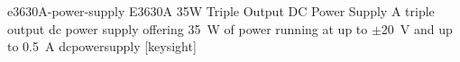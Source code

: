 \newglsXequipment%
{e3630A-power-supply}%
{E3630A 35W Triple Output DC Power Supply}%
{A triple output \gls{dc} power supply offering \SI{35}{\watt} of power running at up to $\pm$\SI{20}{\volt} and up to \SI{0.5}{\ampere}}%
{dcpowersupply}%
[keysight]%